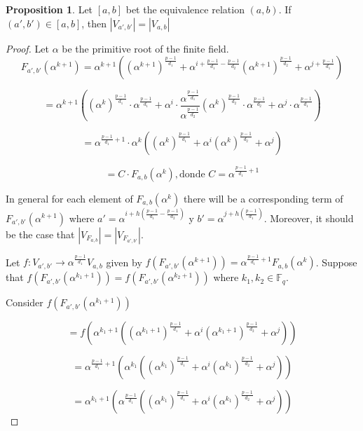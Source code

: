 \documentclass{article}
\theoremstyle{definition}
\newtheorem{prop}[theorem]{Proposition}
\theoremstyle{remark}
\numberwithin{equation}{section}
\begin{document}
\begin{prop}
  
  Let $[a, b]$ bet the equivalence relation $(a, b)$. If $(a', b') \in [a, b]$, then 
  $|V_{a', b'}| = |V_{a, b}|$

\end{prop}

\begin{proof}
  
  Let $\alpha$ be the primitive root of the finite field. $$F_{a', b'}(\alpha^{k+1}) = \alpha^{k+1}((\alpha^{k+1})^{\frac{p-1}{d_1}} + \alpha^{i + \frac{p-1}{d_1} - \frac{p-1}{d_2}}(\alpha^{k+1})^{\frac{p-1}{d_2}} + \alpha^{j + \frac{p-1}{d_1}})$$

  $$= \alpha^{k+1}((\alpha^{k})^{\frac{p-1}{d_1}} \cdot \alpha^{\frac{p-1}{d_1}} + \alpha^{i} \cdot \frac{\alpha^{\frac{p-1}{d_1}}} {\alpha^{\frac{p-1}{d_2}}} (\alpha^{k})^{\frac{p-1}{d_2}} \cdot \alpha^{\frac{p-1}{d_2}} + \alpha^{j} \cdot \alpha^{\frac{p-1}{d_1}})$$

  $$= \alpha^{\frac{p-1}{d_1} + 1} \cdot \alpha^{k}((\alpha^{k})^{\frac{p-1}{d_1}} + \alpha^{i}(\alpha^{k})^{\frac{p-1}{d_2}} + \alpha^{j} )$$

  $$= C \cdot F_{a,b}(\alpha^k), \mbox{donde } C = \alpha^{\frac{p-1}{d_1} + 1}$$

  In general for each element of $F_{a,b}(\alpha^{k})$ there will be a corresponding term of $F_{a',b'}(\alpha^{k+1})$ where $a' = \alpha^{i + h(\frac{p-1}{d_1} - \frac{p-1}{d_2})}$ y $b'= \alpha^{j + h(\frac{p-1}{d_1})}$. Moreover, it should be the case that $\left\vert V_{F_{a,b}} \right\vert = \left\vert V_{F_{a',b'}} \right\vert$.

  Let $f:V_{a', b'} \rightarrow \alpha^{\frac{p-1}{d_1}}V_{a, b}$ given by $f(F_{a', b'}(\alpha^{k+1})) = \alpha^{\frac{p-1}{d_1}+1}F_{a, b}(\alpha^k)$.
  Suppose that $f(F_{a', b'}(\alpha^{k_1+1})) = f(F_{a', b'}(\alpha^{k_2+1}))$ where $k_1, k_2 \in \mathbb{F}_q$. 

  Consider $f(F_{a', b'}(\alpha^{k_1+1}))$

  $$= f(\alpha^{k_1+1}((\alpha^{k_1+1})^{\frac{p-1}{d_1}} + \alpha^{i}(\alpha^{k_1+1})^{\frac{p-1}{d_2}} + \alpha^{j}))$$ 

  $$= \alpha^{\frac{p-1}{d_1}+1}(\alpha^{k_1}((\alpha^{k_1})^{\frac{p-1}{d_1}} + \alpha^{i}(\alpha^{k_1})^{\frac{p-1}{d_2}} + \alpha^{j}))$$ 

  $$= \alpha^{k_1+1}(\alpha^{\frac{p-1}{d_1}}((\alpha^{k_1})^{\frac{p-1}{d_1}} + \alpha^{i}(\alpha^{k_1})^{\frac{p-1}{d_2}} + \alpha^{j}))$$ 


\end{proof}
\end{document}
